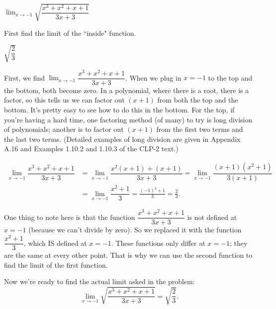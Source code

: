 \begin{Mquestion}
$\displaystyle\lim_{x \rightarrow -1}\sqrt{\dfrac{x^3+x^2+x+1}{3x+3}}$
\end{Mquestion}
\begin{hint} First find the limit of the ``inside" function.
\end{hint}
\begin{answer} $\sqrt{\dfrac{2}{3}}$
\end{answer}
\begin{solution} First, we find $\displaystyle\lim_{x \rightarrow -1}\dfrac{x^3+x^2+x+1}{3x+3}$. When we plug in $x=-1$ to the top and the bottom, both become zero. In a polynomial, where there is a root, there is a factor, so this tells us we can factor out $(x+1)$ from both the top and the bottom. It's pretty easy to see how to do this in the bottom. For the top, if you're having a hard time, one factoring method (of many) to try is long division of polynomials; another is to factor out $(x+1)$ from the first two terms and the last two terms. (Detailed examples of long division are given in Appendix A.16 and Examples 1.10.2 and 1.10.3 of the CLP-2 text.)

\begin{align*}
\displaystyle\lim_{x \rightarrow -1}\dfrac{x^3+x^2+x+1}{3x+3}&=
\displaystyle\lim_{x \rightarrow -1}\dfrac{x^2(x+1)+(x+1)}{3x+3}
=\displaystyle\lim_{x \rightarrow -1}\dfrac{(x+1)(x^2+1)}{3(x+1)}\\
&=
\displaystyle\lim_{x \rightarrow -1}\dfrac{x^2+1}{3}=\frac{(-1)^2+1}{3}=\frac{2}{3}.
\end{align*}

One thing to note here is that the function $\dfrac{x^3+x^2+x+1}{3x+3}$ is not defined at  $x=-1$ (because we can't divide by zero). So we replaced it with the function
$\dfrac{x^2+1}{3}$, which IS defined at $x=-1$. These functions only differ at $x=-1$; they are the same at every other point. That is why we can use the second function to find the limit of the first function.

Now we're ready to find the actual limit asked in the problem:
\[\displaystyle\lim_{x \rightarrow -1}\sqrt{\dfrac{x^3+x^2+x+1}{3x+3}}=
\sqrt{\dfrac{2}{3}}.\]
\end{solution}

